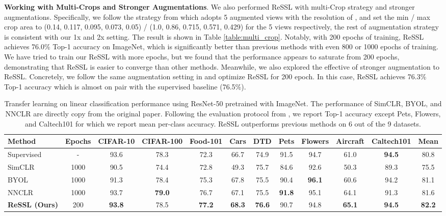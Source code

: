\documentclass{article}
\newcommand{\<}{\left\langle}
\renewcommand{\>}{\right\rangle}
\begin{document}
\textbf{Working with Multi-Crops and Stronger Augmentations}.
We also performed ReSSL with multi-Crop strategy and stronger augmentations. Specifically, we follow the strategy from \cite{adco} which adopts 5 augmented views with the resolution of , and set the min / max crop area to (0.14, 0.117, 0.095, 0.073, 0.05) / (1.0,  0.86,  0.715, 0.571, 0.429) for the 5 views respectively, the rest of augmentation strategy is consistent with our 1x and 2x setting. The result is shown in Table \ref{table:multi_crop}. Notably, with 200 epochs of training, ReSSL achieves 76.0\% Top-1 accuracy on ImageNet, which is significantly better than previous methods with even 800 or 1000 epochs of training. We have tried to train our ReSSL with more epochs, but we found that the performance appears to saturate from 200 epochs, demonstrating that ReSSL is easier to converge than other methods. Meanwhile, we also explored the effective of stronger augmentation to ReSSL. Concretely, we follow the same augmentation setting in \cite{stronger} and optimize ReSSL for 200 epoch. In this case, ReSSL achieves 76.3\% Top-1 accuracy which is almost on pair with the supervised baseline (76.5\%).


\renewcommand\arraystretch{1.0}
\begin{table*}
    \centering
    \caption{Transfer learning on linear classification performance using ResNet-50 pretrained with ImageNet. The performance of SimCLR, BYOL, and NNCLR are directly copy from the original paper. Following the evaluation protocol from \cite{simclr}, we report Top-1 accuracy except Pets, Flowers, and Caltech101 for which we report mean per-class accuracy. ReSSL outperforms previous methods on 6 out of the 9 datasets.}
    \vspace{-10pt}
    \begin{tabular}{l c c c c c c c c c c c}
    \toprule
        Method & Epochs & CIFAR-10 & CIFAR-100 &  Food-101 & Cars & DTD & Pets & Flowers & Aircraft & Caltech101 &  Mean \\ \hline
        Supervised & - & 93.6 & 78.3 & 72.3 & 66.7 & 74.9 & 91.5 & 94.7 & 61.0 & \textbf{94.5} & 80.8 \\
        SimCLR \cite{simclr} & 1000 & 90.5 & 74.4 & 72.8 & 49.3 & 75.7 & 84.6 & 92.6 & 50.3 & 89.3 & 75.5 \\
        BYOL \cite{byol} & 1000 & 91.3 & 78.4 & 75.3 & 67.8 & 75.5 & 90.4 & \textbf{96.1} & 60.6 & 94.2 & 81.1 \\
        NNCLR \cite{nnclr} & 1000 & 93.7 & \textbf{79.0} & 76.7 & 67.1 & 75.5 & \textbf{91.8} & 95.1 & 64.1 & 91.3 & 81.6 \\ 
        \textbf{ReSSL (Ours)} & 200 & \textbf{93.8} & 78.5 & \textbf{77.2} & \textbf{68.3} & \textbf{76.6} & 90.7 & 94.8 & \textbf{65.1} & \textbf{94.5} & \textbf{82.2} \\ 
        \bottomrule
    \end{tabular}
    \label{table:transfer_result}
    \vspace{-10pt}
\end{table*}
\end{document}
